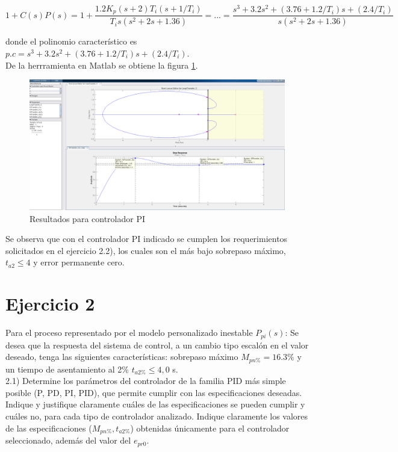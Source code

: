 \documentclass{report}
\begin{document}
\begin{equation*}
    1+C(s)P(s)= 1+ \frac{1.2K_p(s+2)T_i(s+1/T_i)}{T_is(s^2+2s+1.36)} = ... = \frac{s^3+3.2s^2+(3.76+1.2/T_i)s+(2.4/T_i)}{s(s^2+2s+1.36)}
    \label{Eq:12}
\end{equation*}

donde el polinomio característico es \(p.c = s^3+3.2s^2+(3.76+1.2/T_i)s+(2.4/T_i)\).\\

De la herrramienta en Matlab se obtiene la figura \ref{F:P1_PI}.\\

\begin{figure}[h!]
    \centering  
    \includegraphics[width=1\textwidth]{P1_PI.png}
    \caption{Resultados para controlador PI}
    \label{F:P1_PI}
\end{figure}

Se observa que con el controlador PI indicado se cumplen los requerimientos solicitados en el ejercicio 2.2), los cuales son el más bajo sobrepaso máximo, \(t_{a2} \leqslant 4\) y error permanente cero.
\section*{Ejercicio 2}
Para el proceso representado por el modelo personalizado inestable \(P_{pi}(s)\):
Se desea que la respuesta del sistema de control, a un cambio tipo escalón en el valor deseado, tenga las siguientes características: sobrepaso máximo \(M_{pn\%} = 16.3\%\) y un tiempo de 
asentamiento al 2\% \(t_{a2\%} \leqslant 4,0\) s.\\

2.1) Determine los parámetros del controlador de la familia PID más simple posible (P, PD, PI, PID), que permite cumplir con las especificaciones deseadas. Indique y justifique
claramente cuáles de las especificaciones se pueden cumplir y cuáles no, para cada tipo de controlador analizado. Indique claramente los valores de las especificaciones 
(\(M_{pn\%}, t_{a2\%}\)) obtenidas únicamente para el controlador seleccionado, además del valor del \(e_{pr0}\).\\
\end{document}
